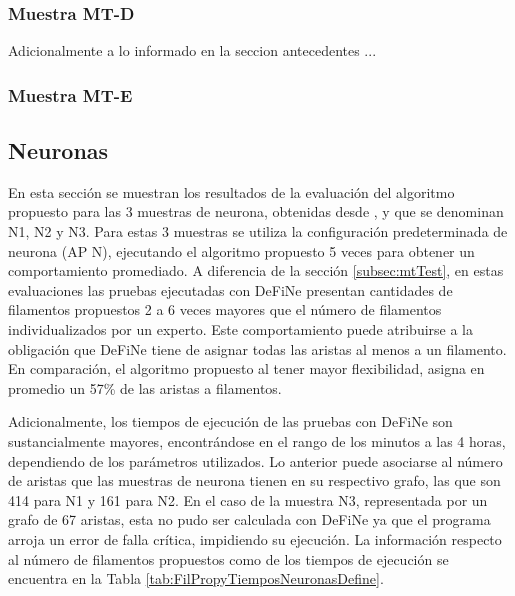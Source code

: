 \clearpage
\newpage

\subsubsection{Muestra MT-D}
Adicionalmente a lo informado en la seccion antecedentes ...

\subsubsection{Muestra MT-E}



\subsection{Neuronas}
\label{subsec:neuronTest}
En esta secci\'on se muestran los resultados de la evaluaci\'on del algoritmo propuesto para las 3 muestras de neurona, obtenidas desde \citet{ampuero2019chronic}, y que se denominan N1, N2 y N3. Para estas 3 muestras se utiliza la configuraci\'on predeterminada de neurona (AP N), ejecutando el algoritmo propuesto 5 veces para obtener un comportamiento promediado. A diferencia de la secci\'on \ref{subsec:mtTest}, en estas evaluaciones las pruebas ejecutadas con DeFiNe presentan cantidades de filamentos propuestos 2 a 6 veces mayores que el n\'umero de filamentos individualizados por un experto. Este comportamiento puede atribuirse a la obligaci\'on que DeFiNe tiene de asignar todas las aristas al menos a un filamento. En comparaci\'on, el algoritmo propuesto al tener mayor flexibilidad, asigna en promedio un 57\% de las aristas a filamentos.

Adicionalmente, los tiempos de ejecuci\'on de las pruebas con DeFiNe son sustancialmente mayores, encontr\'andose en el rango de los minutos a las 4 horas, dependiendo de los par\'ametros utilizados. Lo anterior puede asociarse al n\'umero de aristas que las muestras de neurona tienen en su respectivo grafo, las que son 414 para N1 y 161 para N2. En el caso de la muestra N3, representada por un grafo de 67 aristas, esta no pudo ser calculada con DeFiNe ya que el programa arroja un error de falla cr\'itica, impidiendo su ejecuci\'on. La informaci\'on respecto al n\'umero de filamentos propuestos como de los tiempos de ejecuci\'on se encuentra en la Tabla \ref{tab:FilPropyTiemposNeuronasDefine}.

